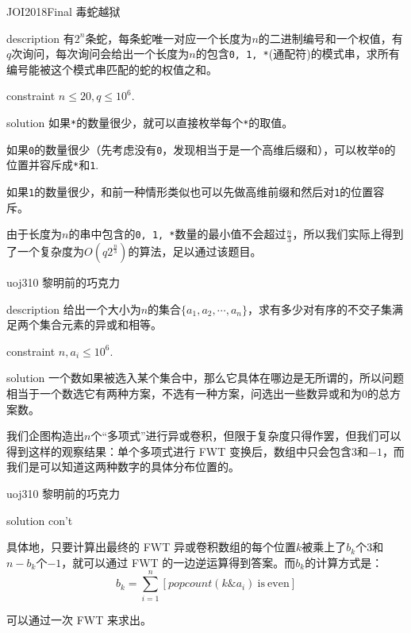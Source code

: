 \documentclass{beamer}
\begin{document}
	\begin{frame}{JOI2018Final 毒蛇越狱}
		\begin{block}{description}
			有$2^n$条蛇，每条蛇唯一对应一个长度为$n$的二进制编号和一个权值，有$q$次询问，每次询问会给出一个长度为$n$的包含\texttt{0, 1, *}(通配符)的模式串，求所有编号能被这个模式串匹配的蛇的权值之和。
		\end{block}
		\begin{block}{constraint}
			$n \le 20, q \le 10^6.$
		\end{block}
		\pause
		\begin{block}{solution}
			如果\texttt{*}的数量很少，就可以直接枚举每个\texttt{*}的取值。
			
			如果\texttt{0}的数量很少（先考虑没有\texttt{0}，发现相当于是一个高维后缀和），可以枚举\texttt{0}的位置并容斥成\texttt{*}和\texttt{1}.
			
			如果\texttt{1}的数量很少，和前一种情形类似也可以先做高维前缀和然后对\texttt{1}的位置容斥。
			
			由于长度为$n$的串中包含的\texttt{0, 1, *}数量的最小值不会超过$\frac{n}{3}$，所以我们实际上得到了一个复杂度为$O(q2^{\frac n3})$的算法，足以通过该题目。
		\end{block}
	\end{frame}
	\begin{frame}{uoj310 黎明前的巧克力}
		\begin{block}{description}
			给出一个大小为$n$的集合$\{a_1, a_2, \cdots, a_n\}$，求有多少对有序的不交子集满足两个集合元素的异或和相等。
		\end{block}
		\begin{block}{constraint}
			$n, a_i \le 10^6.$
		\end{block}
		\pause
		\begin{block}{solution}
			一个数如果被选入某个集合中，那么它具体在哪边是无所谓的，所以问题相当于一个数选它有两种方案，不选有一种方案，问选出一些数异或和为$0$的总方案数。
			
			我们企图构造出$n$个“多项式”进行异或卷积，但限于复杂度只得作罢，但我们可以得到这样的观察结果：单个多项式进行 FWT 变换后，数组中只会包含$3$和$-1$，而我们是可以知道这两种数字的具体分布位置的。
			
		\end{block}
	\end{frame}
	\begin{frame}{uoj310 黎明前的巧克力}
		\begin{block}{solution con't}
			
			具体地，只要计算出最终的 FWT 异或卷积数组的每个位置$k$被乘上了$b_k$个$3$和$n - b_k$个$-1$，就可以通过 FWT 的一边逆运算得到答案。而$b_k$的计算方式是：			
			$$b_k = \sum_{i=1}^{n}[popcount(k \& a_i) \mathrm{\ is\ even}]$$
			
			可以通过一次 FWT 来求出。
		\end{block}
	\end{frame}
	
\end{document}
